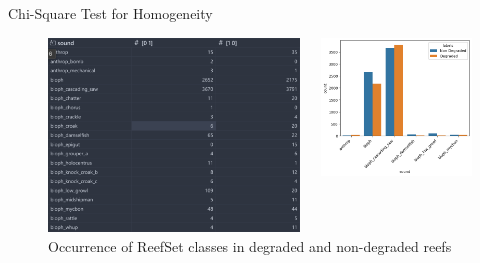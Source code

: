 \begin{frame}{Chi-Square Test for Homogeneity}
    \begin{figure}
        \centering
        \begin{columns}
        \begin{column}{0.5\textwidth}
            \centering
            \includegraphics[height=1.0\textheight,width=1.0\textwidth,keepaspectratio]{images/reefset_classes.png}
        \end{column}
        \begin{column}{0.5\textwidth}
            \centering
            \includegraphics[height=1.0\textheight,width=1.0\textwidth,keepaspectratio]{images/reefset_plot.png}
        \end{column}
    \end{columns}
        \caption{Occurrence of ReefSet classes in degraded and non-degraded reefs}
    \end{figure}
\end{frame}

